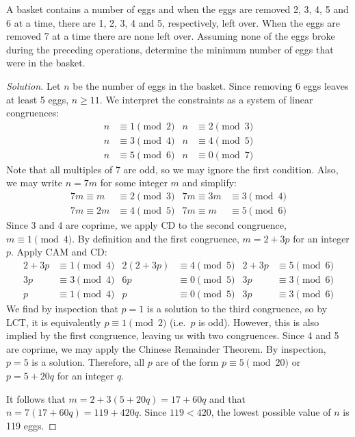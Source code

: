 \documentclass{agony}
\begin{document}
\question A basket contains a number of eggs and when the eggs
are removed 2, 3, 4, 5 and 6 at a time, there are 1, 2, 3, 4 and 5, respectively, left over.
When the eggs are removed 7 at a time there are none left over.
Assuming none of the eggs broke during the preceding operations,
determine the minimum number of eggs that were in the basket.
\begin{proof}[Solution]
  Let $n$ be the number of eggs in the basket.
  Since removing 6 eggs leaves at least 5 eggs, $n \geq 11$.
  We interpret the constraints as a system of linear congruences:
  \begin{align*}
    n & \equiv 1 \pmod{2} & n & \equiv 2 \pmod{3} \\
    n & \equiv 3 \pmod{4} & n & \equiv 4 \pmod{5} \\
    n & \equiv 5 \pmod{6} & n & \equiv 0 \pmod{7}
  \end{align*}
  Note that all multiples of 7 are odd, so we may ignore the first condition.
  Also, we may write $n = 7m$ for some integer $m$ and simplify:
  \begin{align*}
    7m \equiv m  & \equiv 2 \pmod{3} & 7m \equiv 3m & \equiv 3 \pmod{4} \\
    7m \equiv 2m & \equiv 4 \pmod{5} & 7m \equiv m  & \equiv 5 \pmod{6}
  \end{align*}
  Since 3 and 4 are coprime, we apply CD to the second congruence, $m \equiv 1 \pmod{4}$.
  By definition and the first congruence, $m = 2 + 3p$ for an integer $p$.
  Apply CAM and CD\@:
  \begin{align*}
    2+3p & \equiv 1 \pmod{4} & 2(2+3p) & \equiv 4 \pmod{5} & 2+3p & \equiv 5 \pmod{6} \\
    3p   & \equiv 3 \pmod{4} & 6p      & \equiv 0 \pmod{5} & 3p   & \equiv 3 \pmod{6} \\
    p    & \equiv 1 \pmod{4} & p       & \equiv 0 \pmod{5} & 3p   & \equiv 3 \pmod{6}
  \end{align*}
  We find by inspection that $p=1$ is a solution to the third congruence, so by LCT,
  it is equivalently $p \equiv 1 \pmod{2}$ (i.e.\ $p$ is odd).
  However, this is also implied by the first congruence, leaving us with two congruences.
  Since 4 and 5 are coprime, we may apply the Chinese Remainder Theorem.
  By inspection, $p=5$ is a solution.
  Therefore, all $p$ are of the form $p \equiv 5 \pmod{20}$ or $p = 5 + 20q$ for an integer $q$.

  It follows that $m = 2+3(5+20q) = 17 + 60q$ and that $n = 7(17+60q) = 119 + 420q$.
  Since $119 < 420$, the lowest possible value of $n$ is 119 eggs.
\end{proof}
\end{document}
